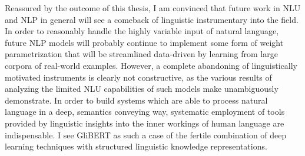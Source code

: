 Reassured by the outcome of this thesis, I am convinced that future work in NLU and
NLP in general will see a comeback of linguistic instrumentary into the field. In
order to reasonably handle the highly variable input of natural language, future NLP
models will probably continue to implement some form of weight parametrization that
will be streamlined data-driven by learning from large corpora of real-world examples.
However, a complete abandoning of linguistically motivated instruments is clearly not
constructive, as the various results of analyzing the limited NLU capabilities of
such models make unambiguously demonstrate. In order to build systems which are able
to process natural language in a deep, semantics conveying way, systematic employment
of tools provided by linguistic insights into the inner workings of human language
are indispensable. I see GliBERT as such a case of the fertile combination of deep
learning techniques with structured linguistic knowledge representations.

